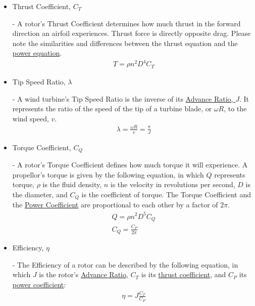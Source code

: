 \documentclass{article}
\begin{document}
\begin{itemize}
	\item \hypertarget{CT}{Thrust Coefficient, $C_{T}$} - A rotor's Thrust Coefficient determines how much thrust in the forward direction an airfoil experiences. Thrust force is directly opposite drag. Please note the similarities and differences between the thrust equation and the \hyperlink{CP}{power equation}.
	\begin{equation}
	\begin{aligned}
		T = \rho n^{2} D^{4} C_{T}
	\end{aligned}
	\end{equation}
	
	\item \hypertarget{lambda}{Tip Speed Ratio, $\lambda$} - A wind turbine's Tip Speed Ratio is the inverse of its \hyperlink{J}{Advance Ratio, $J$}. It represents the ratio of the speed of the tip of a turbine blade, or $\omega R$, to the wind speed, $v$.
	\begin{equation}
	\begin{aligned}
		\lambda = \frac{\omega R}{v} = \frac{\pi}{J}
	\end{aligned}
	\end{equation}
	
	\item \hypertarget{CQ}{Torque Coefficient, $C_{Q}$} - A rotor's Torque Coefficient defines how much torque it will experience. A propellor's torque is given by the following equation, in which $Q$ represents torque, $\rho$ is the fluid density, $n$ is the velocity in revolutions per second, $D$ is the diameter, and $C_{Q}$ is the coefficient of torque. The Torque Coefficient and the \hyperlink{CP}{Power Coefficient} are proportional to each other by a factor of $2\pi$.
	\begin{equation}
	\begin{aligned}
		Q = \rho n^{2} D^{5} C_{Q} \\
		C_{Q} = \frac{C_{P}}{2 \pi}
	\end{aligned}
	\end{equation}
	
	\item \hypertarget{eta}{Efficiency, $\eta$} - The Efficiency of a rotor can be described by the following equation, in which $J$ is the rotor's \hyperlink{J}{Advance Ratio}, $C_{T}$ is its \hyperlink{CT}{thrust coefficient}, and $C_{P}$ its \hyperlink{CP}{power coefficient}:
	\begin{equation}
	\begin{aligned}
		\eta = J \frac{C_{T}}{C_{P}}
	\end{aligned}
	\end{equation}
	

\end{itemize}
\end{document}
